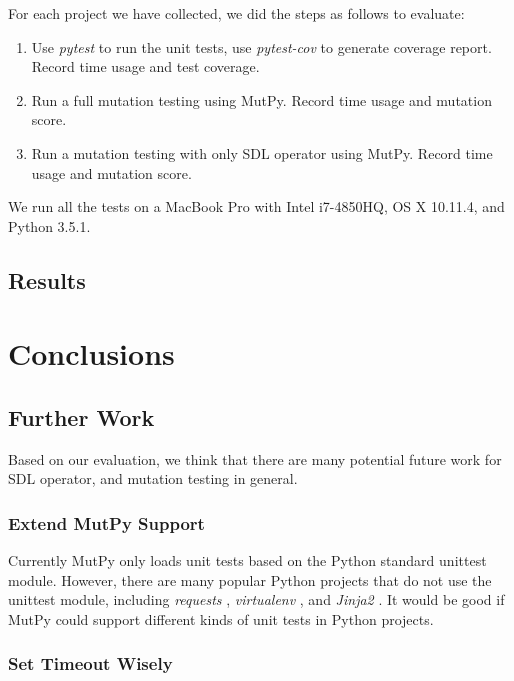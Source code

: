 \documentclass[12pt]{article}
\begin{document}
For each project we have collected, we did the steps as follows to evaluate:

\begin{enumerate}
  \item Use \emph{pytest} \cite{pytest} to run the unit tests, use \emph{pytest-cov} \cite{pytest-cov} to generate coverage report. Record time usage and test coverage.
  \item Run a full mutation testing using MutPy. Record time usage and mutation score.
  \item Run a mutation testing with only SDL operator using MutPy. Record time usage and mutation score.
\end{enumerate}

We run all the tests on a MacBook Pro with Intel i7-4850HQ, OS X 10.11.4, and Python 3.5.1.

\subsection{Results}



\section{Conclusions}

\subsection{Further Work}

Based on our evaluation, we think that there are many potential future work for SDL operator, and mutation testing in general.

\subsubsection{Extend MutPy Support}

Currently MutPy only loads unit tests based on the Python standard unittest module. However, there are many popular Python projects that do not use the unittest module, including \emph{requests} \cite{requests}, \emph{virtualenv} \cite{virtualenv}, and \emph{Jinja2} \cite{jinja2}. It would be good if MutPy could support different kinds of unit tests in Python projects.

\subsubsection{Set Timeout Wisely}
\end{document}
